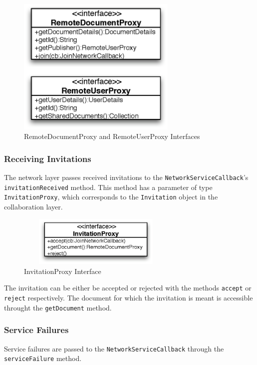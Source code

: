 \begin{figure}[H]
 \centering
 \includegraphics[width=7.62cm,height=6.63cm]{../images/finalreport/architecture_userdocumentproxy_uml.eps}
 \caption{RemoteDocumentProxy and RemoteUserProxy Interfaces}
 \label{fig:archoverview.userdocumentproxy}
\end{figure}


\subsubsection{Receiving Invitations}
The network layer passes received invitations to the 
\texttt{Network\-Service\-Callback}'s \texttt{invitation\-Received} method.
This method has a parameter of type \texttt{Invitation\-Proxy}, which 
corresponds to the \texttt{Invitation} object in the collaboration layer.

\begin{figure}[H]
 \centering
 \includegraphics[width=7.62cm,height=2.40cm]{../images/finalreport/architecture_invitationproxy_uml.eps}
 \caption{InvitationProxy Interface}
\end{figure}

The invitation can be either be accepted or rejected with the methods
\texttt{accept} or \texttt{reject} respectively. The document for which
the invitation is meant is accessible throught the \texttt{get\-Document}
method.


\subsubsection{Service Failures}
Service failures are passed to the \texttt{NetworkServiceCallback} through
the \texttt{serviceFailure} method.


